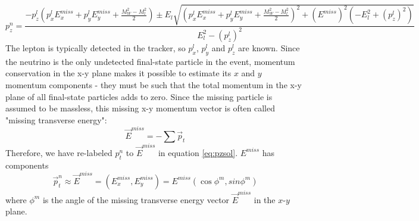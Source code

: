 \documentclass[10pt]{ucscthesisbs}
\begin{document}
\begin{equation} \label{eq:pzsol}
p_z^n = \frac{-p_z^l(p_x^lE^{miss}_x + p_y^lE^{miss}_y + \frac{M_W^2 - M_l^2}{2}) \pm E_l\sqrt{(p_x^lE^{miss}_x + p_y^lE^{miss}_y + \frac{M_W^2 - M_l^2}{2})^2 + (E^{miss})^2(-E_l^2 + (p_z^l)^2)}}{E_l^2 - (p_z^l)^2}
\end{equation}
The lepton is typically detected in the tracker, so $p_x^l$, $p_y^l$ and $p_z^l$ are known. Since the neutrino is the only undetected final-state particle in the event, momentum conservation in the x-y plane makes it possible to estimate its $x$ and $y$ momentum components - they must be such that the total momentum in the x-y plane of all final-state particles adds to zero. Since the missing particle is assumed to be massless, this missing x-y momentum vector is often called "missing transverse energy": \cite{delphes}
\begin{equation} \label{eq:metdef}
\vec{E}^{miss} = -\sum{\vec{p}_t}
\end{equation}
Therefore, we have re-labeled $p_t^n$ to $\vec{E}^{miss}$ in equation \ref{eq:pzsol}. $E^{miss}$ has components 
\begin{equation}
\vec{p}_t^n \approx \vec{E}^{miss} = (E^{miss}_x, E^{miss}_y) = E^{miss}(\cos{\phi^m}, sin{\phi^m})
\end{equation}
where $\phi^m$ is the angle of the missing transverse energy vector $\vec{E}^{miss}$ in the $x$-$y$ plane. 
\end{document}
